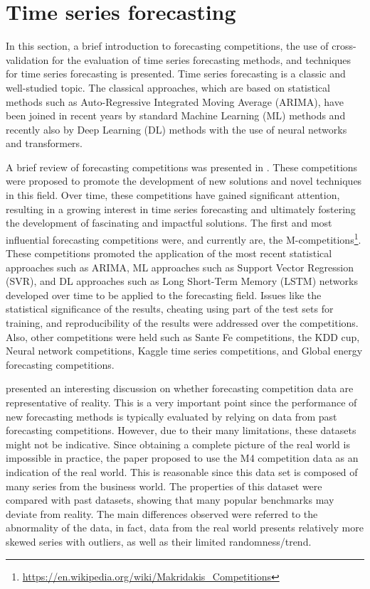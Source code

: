 \section{Time series forecasting}
\label{sec:timeseries}
\vspace{0.2 cm}

In this section, a brief introduction to forecasting competitions, the use of cross-validation for the evaluation of time series forecasting methods, and techniques for time series forecasting is presented.
Time series forecasting is a classic and well-studied topic.
The classical approaches, which are based on statistical methods such as Auto-Regressive Integrated Moving Average (ARIMA), have been joined in recent years by standard Machine Learning (ML) methods and recently also by Deep Learning (DL) methods with the use of neural networks and transformers.

A brief review of forecasting competitions was presented in \cite{HYNDMAN20207}.
These competitions were proposed to promote the development of new solutions and novel techniques in this field.
Over time, these competitions have gained significant attention, resulting in a growing interest in time series forecasting and ultimately fostering the development of fascinating and impactful solutions.
The first and most influential forecasting competitions were, and currently are, the M-competitions\footnote{ \url{https://en.wikipedia.org/wiki/Makridakis_Competitions} }.
These competitions promoted the application of the most recent statistical approaches such as ARIMA, ML approaches such as Support Vector Regression (SVR), and DL approaches such as Long Short-Term Memory (LSTM) networks developed over time to be applied to the forecasting field.
Issues like the statistical significance of the results, cheating using part of the test sets for training, and reproducibility of the results were addressed over the competitions.
Also, other competitions were held such as Sante Fe competitions, the KDD cup, Neural network competitions, Kaggle time series competitions, and Global energy forecasting competitions.

\cite{SPILIOTIS202037} presented an interesting discussion on whether forecasting competition data are representative of reality.
This is a very important point since the performance of new forecasting methods is typically evaluated by relying on data from past forecasting competitions.
However, due to their many limitations, these datasets might not be indicative.
Since obtaining a complete picture of the real world is impossible in practice, the paper proposed to use the M4 competition data as an indication of the real world.
This is reasonable since this data set is composed of many series from the business world.
The properties of this dataset were compared with past datasets, showing that many popular benchmarks may deviate from reality.
The main differences observed were referred to the abnormality of the data, in fact, data from the real world presents relatively more skewed series with outliers, as well as their limited randomness\slash trend.

